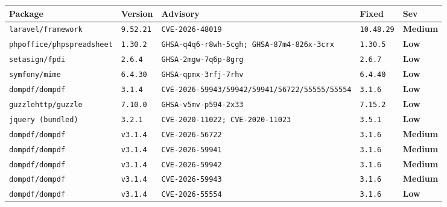 \documentclass[11pt,a4paper]{article}
\newcommand{\sevbadge}[1]{\textbf{\textcolor{sev#1}{#1}}}
\begin{document}
{\renewcommand{\arraystretch}{1.25}%
\begin{longtable}{@{}>{\raggedright\arraybackslash}p{} l >{\raggedright\arraybackslash}p{} l l@{}}
\toprule\textbf{Package} & \textbf{Version} & \textbf{Advisory} & \textbf{Fixed} & \textbf{Sev}\\\midrule\endhead
\texttt{\small laravel/\allowbreak{}framework} & \texttt{\small 9.52.21} & \texttt{\small CVE-2026-48019} & \texttt{\small 10.48.29} & \sevbadge{Medium}\\
\texttt{\small phpoffice/\allowbreak{}phpspreadsheet} & \texttt{\small 1.30.2} & \texttt{\small GHSA-q4q6-r8wh-5cgh; GHSA-87m4-826x-3crx} & \texttt{\small 1.30.5} & \sevbadge{Low}\\
\texttt{\small setasign/\allowbreak{}fpdi} & \texttt{\small 2.6.4} & \texttt{\small GHSA-2mgw-7q6p-8grg} & \texttt{\small 2.6.7} & \sevbadge{Low}\\
\texttt{\small symfony/\allowbreak{}mime} & \texttt{\small 6.4.30} & \texttt{\small GHSA-qpmx-3rfj-7rhv} & \texttt{\small 6.4.40} & \sevbadge{Low}\\
\texttt{\small dompdf/\allowbreak{}dompdf} & \texttt{\small 3.1.4} & \texttt{\small CVE-2026-59943/\allowbreak{}59942/\allowbreak{}59941/\allowbreak{}56722/\allowbreak{}55555/\allowbreak{}55554} & \texttt{\small 3.1.6} & \sevbadge{Low}\\
\texttt{\small guzzlehttp/\allowbreak{}guzzle} & \texttt{\small 7.10.0} & \texttt{\small GHSA-v5mv-p594-2x33} & \texttt{\small 7.15.2} & \sevbadge{Low}\\
\texttt{\small jquery (bundled)} & \texttt{\small 3.2.1} & \texttt{\small CVE-2020-11022; CVE-2020-11023} & \texttt{\small 3.5.1} & \sevbadge{Low}\\
\texttt{\small dompdf/\allowbreak{}dompdf} & \texttt{\small v3.1.4} & \texttt{\small CVE-2026-56722} & \texttt{\small 3.1.6} & \sevbadge{Medium}\\
\texttt{\small dompdf/\allowbreak{}dompdf} & \texttt{\small v3.1.4} & \texttt{\small CVE-2026-59941} & \texttt{\small 3.1.6} & \sevbadge{Medium}\\
\texttt{\small dompdf/\allowbreak{}dompdf} & \texttt{\small v3.1.4} & \texttt{\small CVE-2026-59942} & \texttt{\small 3.1.6} & \sevbadge{Medium}\\
\texttt{\small dompdf/\allowbreak{}dompdf} & \texttt{\small v3.1.4} & \texttt{\small CVE-2026-59943} & \texttt{\small 3.1.6} & \sevbadge{Medium}\\
\texttt{\small dompdf/\allowbreak{}dompdf} & \texttt{\small v3.1.4} & \texttt{\small CVE-2026-55554} & \texttt{\small 3.1.6} & \sevbadge{Low}\\

\end{longtable}}
\end{document}
